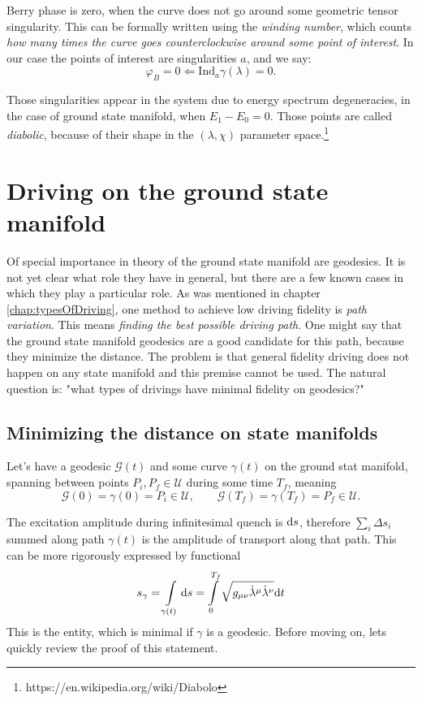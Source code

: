 Berry phase is zero, when the curve does not go around some geometric tensor singularity. This can be formally written using the \emph{winding number}, which counts \emph{how many times the curve goes counterclockwise around some point of interest}. In our case the points of interest are singularities $a$, and we say:
$$\varphi_B=0 \Leftarrow \mathrm{Ind}_a \gamma(\lambda)=0.$$

Those singularities appear in the system due to energy spectrum degeneracies, in the case of ground state manifold, when $E_1-E_0=0$. Those points are called \emph{diabolic}, because of their shape in the $(\lambda,\chi)$ parameter space.\footnote{https://en.wikipedia.org/wiki/Diabolo}














\section{Driving on the ground state manifold}
\label{chap:groundStateManifoldDriving}
Of special importance in theory of the ground state manifold are geodesics. It is not yet clear what role they have in general, but there are a few known cases in which they play a particular role. As was mentioned in chapter \ref{chap:typesOfDriving}, one method to achieve low driving fidelity is \emph{path variation}. This means \emph{finding the best possible driving path}. One might say that the ground state manifold geodesics are a good candidate for this path, because they minimize the distance. The problem is that general fidelity driving does not happen on any state manifold and this premise cannot be used. The natural question is: "what types of drivings have minimal fidelity on geodesics?"


\subsection{Minimizing the distance on state manifolds}
Let's have a geodesic $\mathcal{G}(t)$ and some curve $\gamma(t)$ on the ground stat manifold, spanning between points $P_i,P_f\in \mathcal U$ during some time $T_f$, meaning
 $$\mathcal{G}(0)=\gamma(0)=P_i\in\mathcal U,\qquad \mathcal{G}(T_f)=\gamma(T_f)=P_f\in\mathcal U.$$

The excitation amplitude during infinitesimal quench is $\mathrm{d} s$, therefore $\sum_i \Delta s_i$ summed along path $\gamma(t)$ is the amplitude of transport along that path. This can be more rigorously expressed by functional
\begin{equation}
    s_\gamma=\int\limits_{\gamma(t)}\mathrm{d} s=\int\limits_{0}^{T_f}\sqrt{g_{\mu\nu}\dot\lambda^\mu\dot\lambda^\nu}\mathrm{d} t
\end{equation}
This is the entity, which is minimal if $\gamma$ is a geodesic. Before moving on, lets quickly review the proof of this statement.


